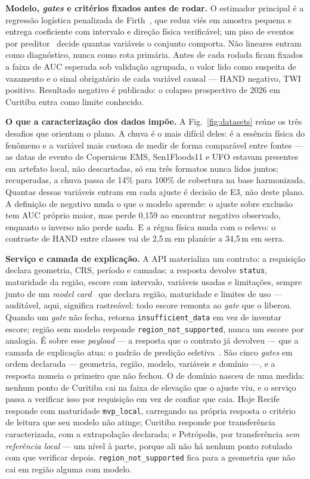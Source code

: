 \documentclass[conference]{IEEEtran}
\begin{document}
\textbf{Modelo, \emph{gates} e critérios fixados antes de rodar.} O estimador
principal é a regressão logística penalizada de Firth~\cite{firth1993}, que reduz
viés em amostra pequena e entrega coeficiente com intervalo e direção física
verificável; um piso de eventos por preditor~\cite{peduzzi1996} decide quantas
variáveis o conjunto comporta. Não lineares entram como diagnóstico, nunca como
rota primária. Antes de cada rodada ficam fixados a faixa de AUC esperada sob
validação agrupada, o valor lido como suspeita de vazamento e o sinal obrigatório
de cada variável causal --- HAND negativo, TWI positivo. Resultado negativo é
publicado: o colapso prospectivo de 2026 em Curitiba entra como limite
conhecido.

\textbf{O que a caracterização dos dados impõe.} A Fig.~\ref{fig:datasets} reúne
os três desafios que orientam o plano. A chuva é o mais difícil deles: é a
essência física do fenômeno e a variável mais custosa de medir de forma
comparável entre fontes --- as datas de evento de Copernicus EMS,
Sen1Floods11 e UFO estavam presentes em artefato local, não descartadas, só
em três formatos nunca lidos juntos; recuperadas, a chuva passa de 14\% para
100\% de cobertura na base harmonizada. Quantas dessas variáveis entram em
cada ajuste é decisão de E3, não deste plano. A definição de negativo muda o
que o modelo aprende: o
ajuste sobre exclusão tem AUC próprio maior, mas perde 0,159 ao encontrar
negativo observado, enquanto o inverso não perde nada. E a régua física muda com
o relevo: o contraste de HAND entre classes vai de 2,5\,m em planície a
34,5\,m em serra.

\textbf{Serviço e camada de explicação.} A API materializa um contrato: a
requisição declara geometria, CRS, período e camadas; a resposta devolve
\texttt{status}, maturidade da região, escore com intervalo, variáveis usadas e
limitações, sempre junto de um \emph{model card}~\cite{mitchell2019} que declara
região, maturidade e limites de uso --- auditável, aqui, significa rastreável:
todo escore remonta ao \emph{gate} que o liberou. Quando um \emph{gate} não
fecha, retorna \texttt{insufficient\_data} em vez de inventar escore; região sem
modelo responde \texttt{region\_not\_supported}, nunca um escore por analogia. É
sobre esse \emph{payload} --- a resposta que o contrato já devolveu --- que a
camada de explicação atua: o padrão de predição seletiva~\cite{mitchell2019}. São
cinco \emph{gates} em ordem declarada --- geometria, região, modelo, variáveis e
domínio ---, e a resposta nomeia o primeiro que não fechou. O de domínio nasceu
de uma medida: nenhum ponto de Curitiba cai na faixa de elevação que o ajuste
viu, e o serviço passa a verificar isso por requisição em vez de confiar que
caia. Hoje Recife responde com maturidade \texttt{mvp\_local}, carregando na
própria resposta o critério de leitura que seu modelo não atinge; Curitiba
responde por transferência caracterizada, com a extrapolação declarada; e
Petrópolis, por transferência \emph{sem referência local} --- um nível à parte,
porque ali não há nenhum ponto rotulado com que verificar depois.
\texttt{region\_not\_supported} fica para a geometria que não cai em região
alguma com modelo.
\end{document}

